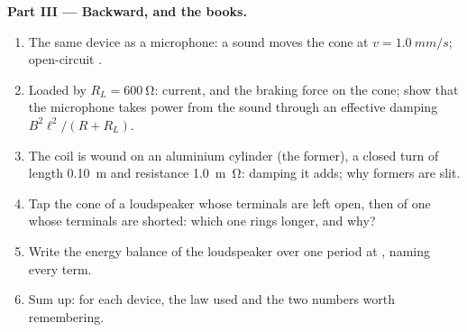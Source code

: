 \begin{problem}
\medskip
\noindent\textbf{Part III --- Backward, and the books.}
\begin{enumerate}[resume]
  \item The same device as a microphone: a sound moves the cone at
        $v = \qty{1.0}{mm/s}$; open-circuit .
  \item Loaded by $R_L = \qty{600}{\ohm}$: current, and the braking force
        on the cone; show that the microphone takes power from the sound
        through an effective damping $B^2\ell^2/(R + R_L)$.
  \item The coil is wound on an aluminium cylinder (the former), a
        closed turn of length \qty{0.10}{m} and resistance \qty{1.0}{m\ohm}:
        damping it adds; why formers are slit.
  \item Tap the cone of a loudspeaker whose terminals are left open,
        then of one whose terminals are shorted: which one rings longer,
        and why?
  \item Write the energy balance of the loudspeaker over one period at
        , naming every term.
  \item Sum up: for each device, the law used and the two numbers
        worth remembering.
\end{enumerate}
\end{problem}

